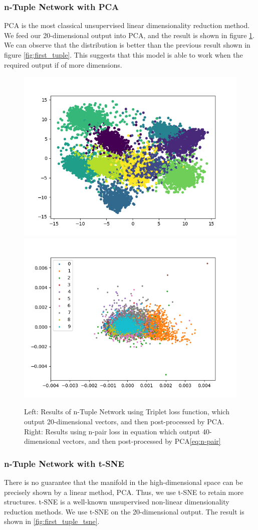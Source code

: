 \documentclass[10pt,twocolumn,letterpaper]{article}
\begin{document}
		\subsubsection{n-Tuple Network with PCA}
			PCA is the most classical unsupervised linear dimensionality reduction method. We feed our 20-dimensional output into PCA, and the result is shown in figure \ref{fig:first_tuple_pca}. We can observe that the distribution is better than the previous result shown in figure \ref{fig:first_tuple}. This suggests that this model is able to work when the required output if of more dimensions. 
			
			\begin{figure}[htbp]
				\begin{center}
					\includegraphics[width=0.5\linewidth]{first_tuple_pca}\includegraphics[width=0.5\linewidth]{pca2}
				\end{center}
				\caption{Left: Results of n-Tuple Network using Triplet loss function, which output 20-dimensional vectors, and then post-processed by PCA. Right: Results using n-pair loss in equation which output 40-dimensional vectors, and then post-processed by PCA\ref{eq:n-pair} \label{fig:first_tuple_pca}}
			\end{figure}
		\subsubsection{n-Tuple Network with t-SNE}
			There is no guarantee that the manifold in the high-dimensional space can be precisely shown by a linear method, PCA. Thus, we use t-SNE to retain more structures. t-SNE \cite{bengio2009learning} is a well-known unsupervised non-linear dimensionality reduction methods. We use t-SNE on the 20-dimensional output. The result is shown in \ref{fig:first_tuple_tsne}.
			
\end{document}
